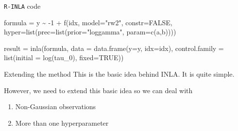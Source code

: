 \documentclass[
  ignorenonframetext,
]{beamer}
\newenvironment{Shaded}{\begin{snugshade}}{\end{snugshade}}
\newcommand{\AttributeTok}[1]{\textcolor[rgb]{0.77,0.63,0.00}{#1}}
\newcommand{\ConstantTok}[1]{\textcolor[rgb]{0.00,0.00,0.00}{#1}}
\newcommand{\DecValTok}[1]{\textcolor[rgb]{0.00,0.00,0.81}{#1}}
\newcommand{\FunctionTok}[1]{\textcolor[rgb]{0.00,0.00,0.00}{#1}}
\newcommand{\NormalTok}[1]{#1}
\newcommand{\OtherTok}[1]{\textcolor[rgb]{0.56,0.35,0.01}{#1}}
\newcommand{\SpecialCharTok}[1]{\textcolor[rgb]{0.00,0.00,0.00}{#1}}
\newcommand{\StringTok}[1]{\textcolor[rgb]{0.31,0.60,0.02}{#1}}
\begin{document}
\begin{frame}[fragile]{\texttt{R-INLA} code}
\protect\hypertarget{r-inla-code}{}
\small

\begin{Shaded}
\begin{Highlighting}[]
\NormalTok{formula }\OtherTok{=}\NormalTok{ y }\SpecialCharTok{\textasciitilde{}} \SpecialCharTok{{-}}\DecValTok{1} \SpecialCharTok{+} \FunctionTok{f}\NormalTok{(idx, }\AttributeTok{model=}\StringTok{"rw2"}\NormalTok{, }\AttributeTok{constr=}\ConstantTok{FALSE}\NormalTok{,}
   \AttributeTok{hyper=}\FunctionTok{list}\NormalTok{(}\AttributeTok{prec=}\FunctionTok{list}\NormalTok{(}\AttributeTok{prior=}\StringTok{"loggamma"}\NormalTok{, }\AttributeTok{param=}\FunctionTok{c}\NormalTok{(a,b))))}

\NormalTok{result }\OtherTok{=} \FunctionTok{inla}\NormalTok{(formula,}
      \AttributeTok{data =} \FunctionTok{data.frame}\NormalTok{(}\AttributeTok{y=}\NormalTok{y, }\AttributeTok{idx=}\NormalTok{idx),}
      \AttributeTok{control.family =} \FunctionTok{list}\NormalTok{(}\AttributeTok{initial =} \FunctionTok{log}\NormalTok{(tau\_0), }\AttributeTok{fixed=}\ConstantTok{TRUE}\NormalTok{))}
\end{Highlighting}
\end{Shaded}

\normalsize
\end{frame}

\begin{frame}{Extending the method}
\protect\hypertarget{extending-the-method}{}
This is the basic idea behind INLA. It is quite simple.

However, we need to extend this basic idea so we can deal with

\begin{enumerate}
\item
  Non-Gaussian observations
\item
  More than one hyperparameter
\end{enumerate}
\end{frame}
\end{document}
